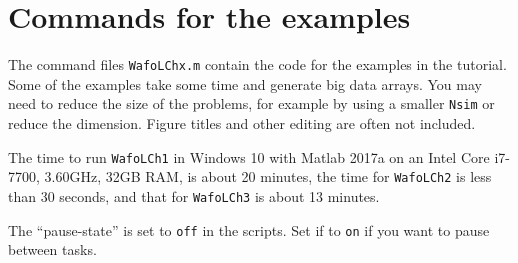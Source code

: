 \appendix
\chapter{Commands for the examples}
The command files {\tt WafoLChx.m} contain the code for the examples in the tutorial. Some of the examples take some time and generate big data arrays. You may need to reduce the size of the problems, for example by using a smaller {\tt Nsim} or reduce the dimension.  
Figure titles and other editing are often not included.

The time to run {\tt WafoLCh1} in Windows 10 with Matlab 2017a on an Intel Core i7-7700, 3.60GHz, 32GB RAM, is about 20 minutes, the time for {\tt WafoLCh2} is less than 30 seconds, and that for 
{\tt WafoLCh3} is about 13 minutes. 

The ``pause-state'' is set to {\tt off} in the scripts. Set if to {\tt on} if you want to pause between tasks.
 
